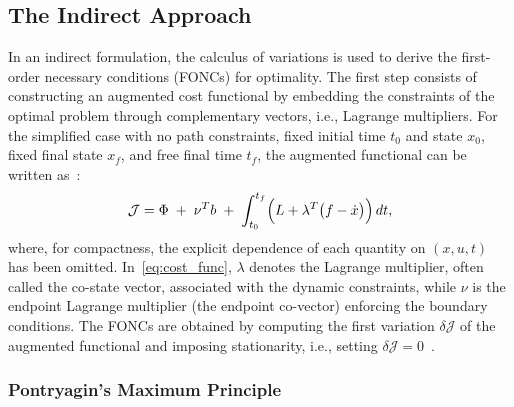 
\subsection{The Indirect Approach}

In an indirect formulation, the calculus of variations is used to derive the first-order necessary conditions (FONCs) for optimality. The first step consists of constructing an augmented cost functional by embedding the constraints of the optimal problem through complementary vectors, i.e., Lagrange multipliers. For the simplified case with no path constraints, fixed initial time $t_0$ and state $x_0$, fixed final state $x_f$, and free final time $t_f$, the augmented functional can be written as~\cite{BettsSurvey1998}:
\begin{equation}
\label{eq:cost_func}
\mathcal{J}
=
\Phi \;+\; \nu^{T} b \;+\; \int_{t_0}^{t_f} \Bigl( L + \lambda^{T}\bigl(f-\dot{x}\bigr) \Bigr)\,dt ,
\end{equation}
where, for compactness, the explicit dependence of each quantity on $(x,u,t)$ has been omitted. In~\ref{eq:cost_func}, $\lambda$ denotes the Lagrange multiplier, often called the co-state vector, associated with the dynamic constraints, while $\nu$ is the endpoint Lagrange multiplier (the endpoint co-vector) enforcing the boundary conditions. The FONCs are obtained by computing the first variation $\delta \mathcal{J}$ of the augmented functional and imposing stationarity, i.e., setting $\delta \mathcal{J}=0$~\cite{Liberzon2012CalculusVariationsOptimalControl}.


\subsubsection{Pontryagin's Maximum Principle}

